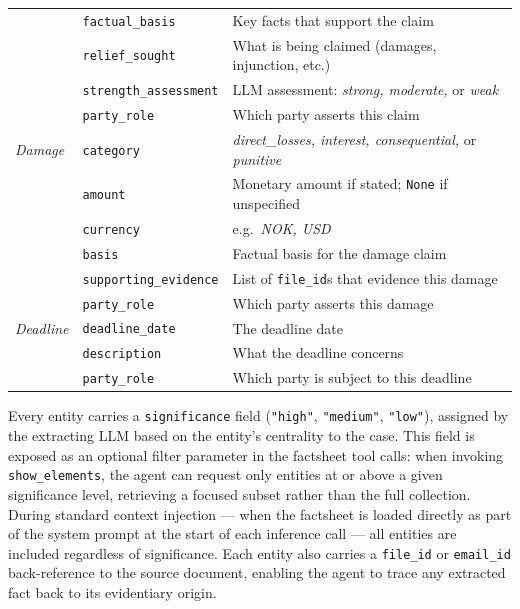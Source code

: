 \begin{table}[H]
\begin{tabular}{llp{6.5cm}}
                   & \texttt{factual\_basis}      & Key facts that support the claim \\
                   & \texttt{relief\_sought}      & What is being claimed (damages, injunction, etc.) \\
                   & \texttt{strength\_assessment} & LLM assessment: \textit{strong, moderate,} or \textit{weak} \\
                   & \texttt{party\_role}         & Which party asserts this claim \\
\midrule
\textit{Damage}    & \texttt{category}           & \textit{direct\_losses, interest, consequential,} or \textit{punitive} \\
                   & \texttt{amount}             & Monetary amount if stated; \texttt{None} if unspecified \\
                   & \texttt{currency}           & e.g.\ \textit{NOK, USD} \\
                   & \texttt{basis}              & Factual basis for the damage claim \\
                   & \texttt{supporting\_evidence} & List of \texttt{file\_id}s that evidence this damage \\
                   & \texttt{party\_role}         & Which party asserts this damage \\
\midrule
\textit{Deadline}  & \texttt{deadline\_date}     & The deadline date \\
                   & \texttt{description}        & What the deadline concerns \\
                   & \texttt{party\_role}         & Which party is subject to this deadline \\
\bottomrule
\end{tabular}
\end{table}

Every entity carries a \texttt{significance} field (\texttt{"high"}, \texttt{"medium"}, \texttt{"low"}), assigned by the extracting LLM based on the entity's centrality to the case.
This field is exposed as an optional filter parameter in the factsheet tool calls: when invoking \texttt{show\_elements}, the agent can request only entities at or above a given significance level, retrieving a focused subset rather than the full collection.
During standard context injection --- when the factsheet is loaded directly as part of the system prompt at the start of each inference call --- all entities are included regardless of significance.
Each entity also carries a \texttt{file\_id} or \texttt{email\_id} back-reference to the source document,
enabling the agent to trace any extracted fact back to its evidentiary origin.

